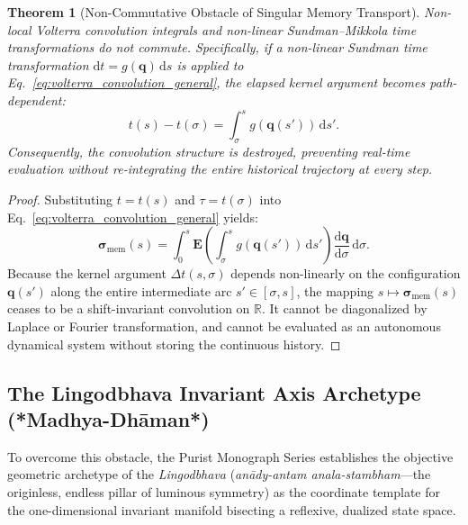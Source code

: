 \documentclass[11pt,a4paper,reqno]{article}
\theoremstyle{plain}
\newtheorem{theorem}{Theorem}[section]
\theoremstyle{definition}
\theoremstyle{remark}
\numberwithin{equation}{section}
\numberwithin{table}{section}
\providecommand{\diff}{\mathrm{d}}
\begin{document}
\begin{theorem}[Non-Commutative Obstacle of Singular Memory Transport]
\label{thm:non_commutative_obstacle}
Non-local Volterra convolution integrals and non-linear Sundman--Mikkola time transformations \cite{sundman1912, mikkola1999} do not commute. Specifically, if a non-linear Sundman time transformation $\diff t = g(\bm{q})\,\diff s$ is applied to Eq.~\eqref{eq:volterra_convolution_general}, the elapsed kernel argument becomes path-dependent:
\begin{equation}
  t(s) - t(\sigma) = \int_\sigma^s g(\bm{q}(s')) \, \diff s'.
  \label{eq:path_dependent_time}
\end{equation}
Consequently, the convolution structure is destroyed, preventing real-time evaluation without re-integrating the entire historical trajectory at every step.
\end{theorem}

\begin{proof}
Substituting $t = t(s)$ and $\tau = t(\sigma)$ into Eq.~\eqref{eq:volterra_convolution_general} yields:
\begin{equation}
  \bm{\sigma}_{\mathrm{mem}}(s) = \int_0^s \mathbf{E}\left( \int_\sigma^s g(\bm{q}(s')) \, \diff s' \right) \frac{\diff\bm{q}}{\diff\sigma} \, \diff\sigma.
\end{equation}
Because the kernel argument $\Delta t(s, \sigma)$ depends non-linearly on the configuration $\bm{q}(s')$ along the entire intermediate arc $s' \in [\sigma, s]$, the mapping $s \mapsto \bm{\sigma}_{\mathrm{mem}}(s)$ ceases to be a shift-invariant convolution on $\mathbb{R}$. It cannot be diagonalized by Laplace or Fourier transformation, and cannot be evaluated as an autonomous dynamical system without storing the continuous history.
\end{proof}

\subsection{The Lingodbhava Invariant Axis Archetype \texorpdfstring{(*Madhya-Dh\={a}man*)}{(Madhya-Dhaman)}}
To overcome this obstacle, the Purist Monograph Series establishes the objective geometric archetype of the \emph{Lingodbhava} (\textit{an\={a}dy-antam anala-stambham}---the originless, endless pillar of luminous symmetry) \cite{PuristVol3Monograph2026} as the coordinate template for the one-dimensional invariant manifold bisecting a reflexive, dualized state space.
\end{document}
